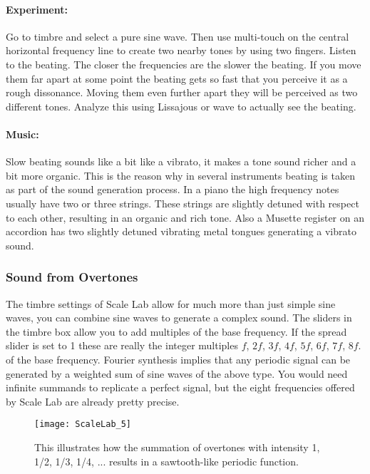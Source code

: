 \paragraph{Experiment:} Go to timbre and select a pure sine wave. Then use multi-touch on the central horizontal frequency line to create two nearby tones by using two fingers. Listen to the beating. The closer the frequencies are the slower the beating. If you move them far apart at some point the beating gets so fast that you perceive it as a rough dissonance. Moving them even further apart they will be perceived as two different tones. Analyze this using Lissajous or wave to actually see the beating.

\paragraph{Music:} Slow beating sounds like a bit like a vibrato, it makes a tone sound richer and a bit more organic. This is the reason why in several instruments beating is taken as part of the sound generation process. In a piano the high frequency notes usually have two or three strings. These strings are slightly detuned with respect to each other, resulting in an organic and rich tone. Also a Musette register on an accordion has two slightly detuned vibrating metal tongues generating a vibrato sound.

\subsubsection{Sound from Overtones}
The timbre settings of Scale Lab allow for much more than just simple sine waves, you can combine sine waves to generate a complex sound. The sliders in the timbre box allow you to add multiples of the base frequency. If the spread slider is set to 1 these are really the integer multiples $f$, $2f$, $3f$, $4f$, $5f$, $6f$, $7f$, $8f$. of the base frequency. Fourier synthesis implies that any periodic signal can be generated by a weighted sum of sine waves of the above type. You would need infinite summands to replicate a perfect signal, but the eight frequencies offered by Scale Lab are already pretty precise.

\begin{figure}
\centering
\texttt{[image: ScaleLab\_5]}
\caption*{This illustrates how the summation of overtones with intensity 1, 1/2, 1/3, 1/4, ... results in a sawtooth-like periodic function.}
\end{figure}

